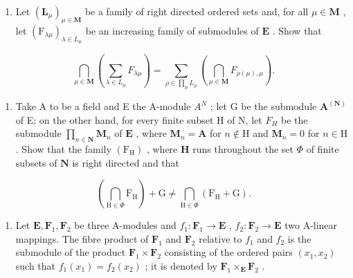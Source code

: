 \begin{enumerate}
\def\labelenumi{(\alph{enumi})}
\tightlist
\item
  Let \((\mathbf{L}_{\mu})_{\mu \in \mathbf{M}}\) be a family of right directed ordered sets and, for all \(\mu \in \mathbf{M}\) , let \((\mathrm{F}_{\lambda \mu})_{\lambda \in L_{\mu}}\) be an increasing family of submodules of \(\mathbf{E}\) . Show that
\end{enumerate}

\[
\bigcap_ {\mu \in \mathbf {M}} \left(\sum_ {\lambda \in L _ {\mu}} F _ {\lambda \mu}\right) = \sum_ {\rho \in \prod_ {\mu} L _ {\mu}} \left(\bigcap_ {\mu \in \mathbf {M}} F _ {\rho (\mu), \mu}\right).
\]

\begin{enumerate}
\def\labelenumi{(\alph{enumi})}
\setcounter{enumi}{1}
\tightlist
\item
  Take A to be a field and E the A-module \(A^{N}\) ; let G be the submodule \(\mathbf{A}^{(\mathbf{N})}\) of E; on the other hand, for every finite subset H of N, let \(F_{H}\) be the submodule \(\prod_{n\in \mathbf{N}}\mathbf{M}_n\) of \(\mathbf{E}\) , where \(\mathbf{M}_n = \mathbf{A}\) for \(n\notin \mathrm{H}\) and \(\mathbf{M}_n = 0\) for \(n\in \mathrm{H}\) . Show that the family \((\mathrm{F_H})\) , where \(\mathbf{H}\) runs throughout the set \(\Phi\) of finite subsets of \(\mathbf{N}\) is right directed and that
\end{enumerate}

\[
\left(\bigcap_ {\mathrm{H} \in \Phi} \mathrm{F} _ {\mathrm{H}}\right) + \mathrm{G} \neq \bigcap_ {\mathrm{H} \in \Phi} (\mathrm{F} _ {\mathrm{H}} + \mathrm{G}).
\]

\begin{enumerate}
\def\labelenumi{\arabic{enumi}.}
\setcounter{enumi}{3}
\tightlist
\item
  Let \(\mathbf{E}, \mathbf{F}_1, \mathbf{F}_2\) be three A-modules and \(f_1: \mathbf{F}_1 \to \mathbf{E}\) , \(f_2: \mathbf{F}_2 \to \mathbf{E}\) two A-linear mappings. The fibre product of \(\mathbf{F}_1\) and \(\mathbf{F}_2\) relative to \(f_1\) and \(f_2\) is the submodule of the product \(\mathbf{F}_1 \times \mathbf{F}_2\) consisting of the ordered pairs \((x_1, x_2)\) such that \(f_1(x_1) = f_2(x_2)\) ; it is denoted by \(\mathbf{F}_1 \times_{\mathbf{E}} \mathbf{F}_2\) .
\end{enumerate}

